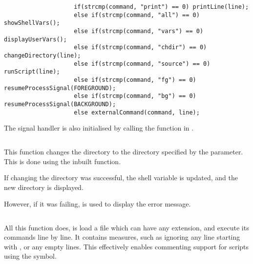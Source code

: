 \documentclass[12pt, a4paper]{report}
\begin{document}
                \begingroup
                \fontsize{10pt}{10pt}\selectfont
                \begin{verbatim}
                    if(strcmp(command, "print") == 0) printLine(line);
                    else if(strcmp(command, "all") == 0) showShellVars();
                    else if(strcmp(command, "vars") == 0) displayUserVars();
                    else if(strcmp(command, "chdir") == 0) changeDirectory(line); 
                    else if(strcmp(command, "source") == 0) runScript(line);
                    else if(strcmp(command, "fg") == 0) resumeProcessSignal(FOREGROUND);
                    else if(strcmp(command, "bg") == 0) resumeProcessSignal(BACKGROUND);
                    else externalCommand(command, line);
                \end{verbatim}
                \endgroup

                The signal handler is also initialised by calling the 
                function in .

                \clearpage
            
            \subsection{}
                This function changes the directory to the directory specified by
                the parameter. This is done using the inbuilt  function.

                If changing the directory was successful, the  shell
                variable is updated, and the new directory is displayed.

                However, if it was failing,  is used to display the
                error message.
            
            \subsection{}
                All this function does, is load a  file which can have
                any extension, and execute its commands line by line. It contains
                measures, such as ignoring any line starting with \tx{\#}, or 
                any empty lines. This effectively enables commenting support for 
                scripts using the \tx{\#} symbol.
\end{document}
